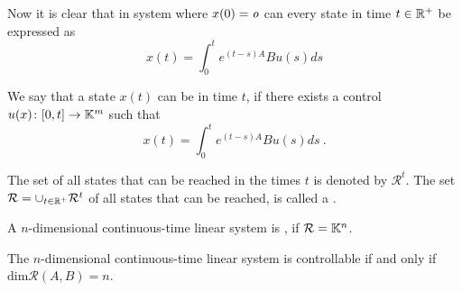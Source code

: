 Now it is clear that in system where $x(0)=\textit{o}$ can every state in time $t\in \mathbb{R}^+$ be expressed as $$x(t)=\int^t_0 e^{(t-s)A}Bu(s)ds$$

\begin{definition}
	We say that a state $x(t)$ can be  in time $t$, if there exists a control $u(x)\colon[0,t]\rightarrow\mathbb{K}^m$ such that
	$$x(t)=\int^t_0 e^{(t-s)A}Bu(s)ds\ .$$

	The set of all states that can be reached in the times $t$ is denoted by $\mathcal{R}^t$. The set $\mathcal{R}=\cup_{t\in\mathbb{R}^+}\mathcal{R}^t$ of all states that can be reached, is called a .
\end{definition}

\begin{definition}
	A $n$-dimensional continuous-time linear system is , if $\mathcal{R}=\mathbb{K}^n$.
\end{definition}

\begin{theorem}
	The $n$-dimensional continuous-time linear system is controllable if and only if $\text{dim}\mathcal{R}(A,B)=n$.
\end{theorem}

